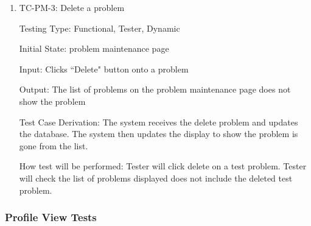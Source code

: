 \documentclass[12pt, titlepage]{article}
\begin{document}
\begin{enumerate}
\item{TC-PM-3: Delete a problem}

Testing Type: Functional, Tester, Dynamic
					
Initial State: problem maintenance page
					
Input: Clicks ``Delete" button onto a problem
					
Output: The list of problems on the problem maintenance page does not show the problem

Test Case Derivation: The system receives the delete problem and updates the database. The system then updates the display to show the problem is gone from the list.
					
How test will be performed: Tester will click delete on a test problem. Tester will check the list of problems displayed does not include the deleted test problem.
\end{enumerate}

\subsubsection{Profile View Tests}

\end{document}

